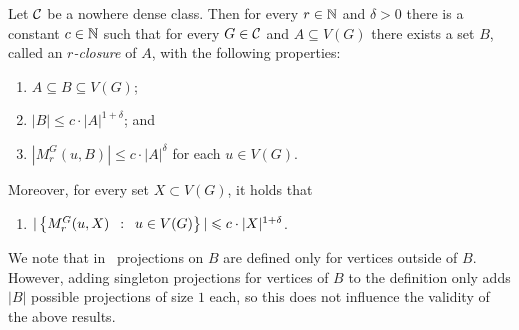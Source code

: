
\begin{lemma}\label{lem:closure-nd}
Let $\mathcal{C}$ be a nowhere dense class. 
Then for every $r\in\mathbb{N}$ and $\delta>0$ there is a 
constant $c\in\mathbb{N}$ such that for every $G\in \mathcal{C}$ and $A\subseteq V(G)$ there exists a set 
$B$,  called an {\em{$r$-closure}} of $A$, 
with the following properties: 
\begin{enumerate}%
  \item $A\subseteq B\subseteq V(G)$;
  \item $|B|\leq c\cdot |A|^{1+\delta}$; and
  \item $|M_r^G(u,B)|\leq c\cdot |A|^{\delta}$ for each $u\in V(G)$.
  \end{enumerate}
  Moreover, for every set $X\subset V(G)$, it holds that
  \begin{enumerate}%
  \item $|\left\{M_r^G(u,X) \,~:~\, u\in V(G) \right\}|\leqslant c\cdot |X|^{1+\delta}$.
\end{enumerate}
\end{lemma}

We note that in~\cite{drange2016kernelization,eickmeyer2016neighborhood} projections on $B$ are defined only for vertices outside of $B$. 
However, adding singleton projections for vertices of $B$ to the definition only adds $|B|$ possible projections of size $1$ each, so this does not influence the validity of the above results.


